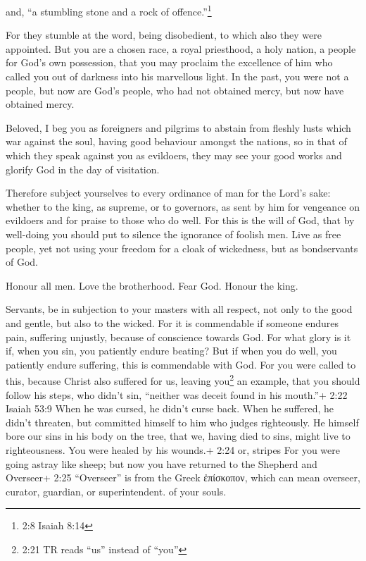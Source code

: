  and, ``a stumbling stone and a rock of
offence.''\footnote{2:8 Isaiah 8:14}

For they stumble at the word, being disobedient, to which also they were
appointed.  But you are a chosen race, a royal priesthood, a
holy nation, a people for God's own possession, that you may proclaim
the excellence of him who called you out of darkness into his marvellous
light.  In the past, you were not a people, but now are
God's people, who had not obtained mercy, but now have obtained mercy.

 Beloved, I beg you as foreigners and pilgrims to abstain
from fleshly lusts which war against the soul,  having good
behaviour amongst the nations, so in that of which they speak against
you as evildoers, they may see your good works and glorify God in the
day of visitation.

 Therefore subject yourselves to every ordinance of man for
the Lord's sake: whether to the king, as supreme,  or to
governors, as sent by him for vengeance on evildoers and for praise to
those who do well.  For this is the will of God, that by
well-doing you should put to silence the ignorance of foolish men.
 Live as free people, yet not using your freedom for a
cloak of wickedness, but as bondservants of God.

 Honour all men. Love the brotherhood. Fear God. Honour the
king.

 Servants, be in subjection to your masters with all
respect, not only to the good and gentle, but also to the wicked.
 For it is commendable if someone endures pain, suffering
unjustly, because of conscience towards God.  For what
glory is it if, when you sin, you patiently endure beating? But if when
you do well, you patiently endure suffering, this is commendable with
God.  For you were called to this, because Christ also
suffered for us, leaving you\footnote{2:21 TR reads ``us'' instead of
  ``you''} an example, that you should follow his steps, 
who didn't sin, ``neither was deceit found in his mouth.''+ 2:22 Isaiah
53:9  When he was cursed, he didn't curse back. When he
suffered, he didn't threaten, but committed himself to him who judges
righteously.  He himself bore our sins in his body on the
tree, that we, having died to sins, might live to righteousness. You
were healed by his wounds.+ 2:24 or, stripes  For you were
going astray like sheep; but now you have returned to the Shepherd and
Overseer+ 2:25 ``Overseer'' is from the Greek ἐπίσκοπον, which can mean
overseer, curator, guardian, or superintendent. of your souls.

